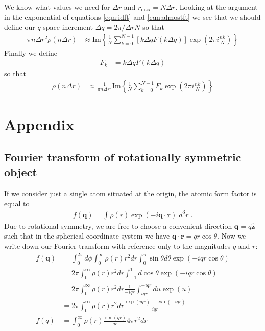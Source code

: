 \documentclass[11pt]{article}
\renewcommand{\vec}[1]{\boldsymbol{#1}}
\newcommand{\hvec}[1]{\hat{\vec{#1}}}
\begin{document}
We know what values we need for $\Delta r$ and $r_\text{max} = N \Delta r$.  Looking at the argument in the exponential of equations \ref{eqn:idft} and \ref{eqn:almostft} we see that we should define our $q$-space increment $\Delta q  = 2\pi / \Delta r N$ so that
\begin{align}
\pi n \Delta r^2 \rho(n \Delta r) &\approx  \text{Im} \left\{ \frac{1}{N}  \sum_{k=0}^{N-1}     [k \Delta q F(k \Delta q)]  \exp\left( 2\pi i \frac{nk}{ N} \right) \right\}
\end{align}
Finally we define 
\begin{align}
F_k &= k \Delta q F(k \Delta q)
\end{align}
so that
\begin{align}
\rho(n \Delta r) &\approx \frac{1}{\pi n \Delta r^2 } \text{Im} \left\{ \frac{1}{N}  \sum_{k=0}^{N-1}    F_k  \exp\left( 2\pi i \frac{nk}{ N} \right) \right\}
\end{align}


\section{Appendix}

\subsection{Fourier transform of rotationally symmetric object}

If we consider just a single atom situated at the origin, the atomic form factor is equal to
\begin{align}
 f(\vec{q})  = \int \rho(r) \exp(-i \vec{q}\cdot\vec{r}) \; d^3r \; .
\end{align}
Due to rotational symmetry, we are free to choose a convenient direction $\vec{q} = q \hvec{z}$ such that in the spherical coordinate system we have $\vec{q}\cdot\vec{r} =  q r \cos\theta$.  Now we write down our Fourier transform with reference only to the magnitudes $q$ and $r$:
\begin{align}
f(\vec{q})  &= \int_0^{2\pi} d\phi \int_0^\infty \rho(r) r^2 dr \int_0^\pi \sin\theta d\theta  \exp(-i q r \cos\theta)  \\
&=2\pi \int_0^\infty \rho(r) r^2 dr \int_{-1}^1  d\cos\theta  \exp(-i q r \cos\theta)  \\
&=2\pi \int_0^\infty \rho(r) r^2 dr \frac{1}{-iqr}\int_{iqr}^{-iqr}  du  \exp(u)  \\
&=2\pi \int_0^\infty \rho(r) r^2 dr \frac{\exp(iqr) - \exp(-iqr)}{iqr}   \\
f(q) &= \int_0^\infty \rho(r)   \frac{\sin(qr)}{qr}  4\pi r^2 dr  
\end{align}


\newpage






\end{document}
